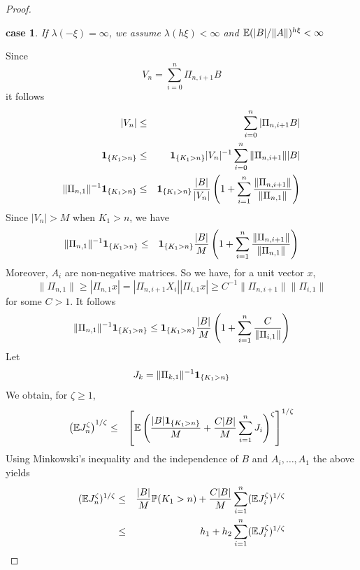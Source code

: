 \documentclass[aoas,preprint]{imsart}
\newtheorem{case}{case}
\numberwithin{equation}{section}
\theoremstyle{plain}
\begin{document}
\begin{proof}
  \begin{case}
    If $\lambda(-\xi) = \infty$, we assume $\lambda(h\xi) <
    \infty$ and $\mathbb{E}(|B|/\|A\|)^{h\xi} <  \infty$
  \end{case}
  Since
  \[
  V_n = \sum_{i=0}^n \Pi_{n, i+1} B
  \]
  it follows
  \begin{eqnarray*}
    |V_n|
    &\leq&
    \sum_{i=0}^{n} |\Pi_{n, i+1} B| \\
    \mathbf{1}_{\{K_1 > n\}}
    &\leq&
    \mathbf{1}_{\{K_1 > n\}}
    |V_n|^{-1}
    \sum_{i=0}^{n} \|\Pi_{n, i+1}\| |B| \\
    \|\Pi_{n, 1}\|^{-1} \mathbf{1}_{\{K_1 > n\}}
    &\leq&
    \mathbf{1}_{\{K_1 > n\}}
      {
        |B| \over |V_n|
      }
    \left(
    1 + \sum_{i=1}^n {
      \|\Pi_{n, i+1}\|
        \over
        \|\Pi_{n, 1}\|
      }
    \right)
  \end{eqnarray*}
  Since $|V_n| > M$ when $K_1 > n$, we have
  \begin{eqnarray*}
    \|\Pi_{n, 1}\|^{-1} \mathbf{1}_{\{K_1 > n\}}
    &\leq&
    \mathbf{1}_{\{K_1 > n\}}
      {
        |B| \over M
      }
    \left(
    1 + \sum_{i=1}^n {
      \|\Pi_{n, i+1}\|
        \over
        \|\Pi_{n, 1}\|
      }
    \right)
  \end{eqnarray*}
  Moreover, $A_i$ are non-negative matrices. So we have, for a unit vector $x$,
  \[
  \|\Pi_{n, 1}\| \geq |\Pi_{n,1} x| = |\Pi_{n, i+1} X_i| |\Pi_{i, 1} x|
  \geq
  C^{-1}
  \|\Pi_{n, i+1}\|
  \|\Pi_{i, 1}\|
  \]
  for some $C > 1$. It follows
  \begin{equation}
    \label{eq:lower_bound}
    \|\Pi_{n, 1}\|^{-1} \mathbf{1}_{\{K_1 > n\}}
    \leq
     \mathbf{1}_{\{K_1 > n\}}
    {|B| \over M} \left(
      1 + \sum_{i=1}^n {
        C
        \over
        \|\Pi_{i, 1}\|
      }
    \right)
  \end{equation}
  Let
  \[
  J_k = \|\Pi_{k, 1}\|^{-1} \mathbf{1}_{\{K_1 > n\}}
  \]
  We obtain, for $\zeta \geq 1$,
  \begin{eqnarray*}
    \left(
      \mathbb{E} J_n^\zeta
    \right)^{1/\zeta} &\leq& \left[
      \mathbb{E} \left(
        {|B| \mathbf{1}_{\{K_1 > n\}} \over M}
        + {C |B|\over M} \sum_{i=1}^n  J_i
      \right)^\zeta
    \right]^{1/\zeta}
  \end{eqnarray*}
  Using Minkowski's inequality and the independence of $B$ and
  $A_i, \dots, A_1$ the above yields
  \begin{eqnarray}
    (\E J_n^\zeta)^{1/\zeta} &\leq&
    {|B| \over M} \P(K_1 > n)
    + {C |B|\over M}
    \sum_{i=1}^n
    (\E J_i^\zeta)^{1/\zeta}
    \label{eq:neg_pow_ub} \\
    &\leq&
    h_1 + h_2 \sum_{i=1}^{n} (\E J_i^\zeta)^{1/\zeta}

\end{eqnarray}
\end{proof}
\end{document}
